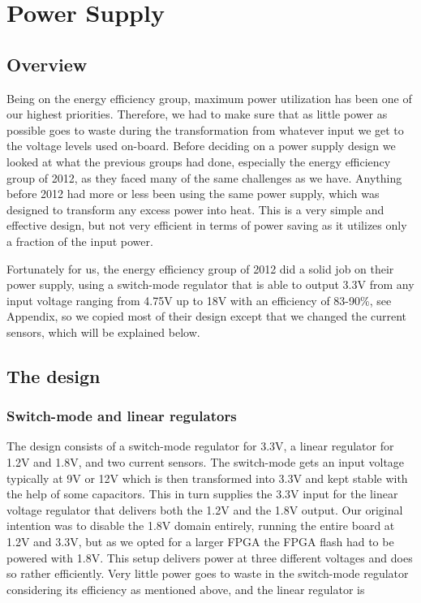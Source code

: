 \section{Power Supply}
\subsection{Overview}
Being on the energy efficiency group, maximum power utilization has been one of
our highest priorities. Therefore, we had to make sure that as little power as
possible goes to waste during the transformation from whatever input we get to
the voltage levels used on-board. Before deciding on a power supply design we
looked at what the previous groups had done, especially the energy efficiency
group of 2012, as they faced many of the same challenges as we have. Anything
before 2012 had more or less been using the same power supply, which was
designed to transform any excess power into heat. This is a very simple and
effective design, but not very efficient in terms of power saving as it utilizes
only a fraction of the input power.

Fortunately for us, the energy efficiency group of 2012 did a solid job on their
power supply, using a switch-mode regulator that is able to output 3.3V from
any input voltage ranging from 4.75V up to 18V with an efficiency of 83-90\%, see
Appendix, so we copied most of their design
except that we changed the current sensors, which will be explained below.

\subsection{The design}
\subsubsection{Switch-mode and linear regulators}
The design consists of a switch-mode regulator for 3.3V, a linear regulator for
1.2V and 1.8V, and two current sensors. The switch-mode gets an input voltage typically at
9V or 12V which is then transformed into 3.3V and kept stable with the help of
some capacitors. This in turn supplies the 3.3V input for the linear voltage
regulator that delivers both the 1.2V and the 1.8V output. Our original
intention was to disable the 1.8V domain entirely, running the entire board at
1.2V and 3.3V, but as we opted for a larger FPGA the FPGA flash had to be
powered with 1.8V. This setup delivers power at three different voltages and
does so rather efficiently. Very little power goes to waste in the switch-mode
regulator considering its efficiency as mentioned above, and the linear
regulator is 

